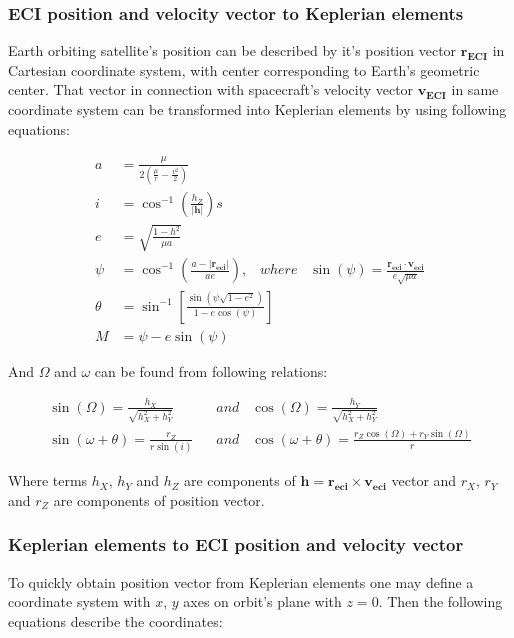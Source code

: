     \subsubsection{ECI position and velocity vector to Keplerian elements}
        Earth orbiting satellite's position can be described by it's position vector $\textbf{r}_{\textbf{ECI}}$ in Cartesian coordinate system, with center corresponding to Earth's geometric center. That vector in connection with spacecraft's velocity vector $\textbf{v}_{\textbf{ECI}}$ in same coordinate system can be transformed into Keplerian elements by using following equations:
        
        \begin{align}
            a &= \frac{\mu}{2\left(\frac{\mu}{r}-\frac{v^2}{2}\right)} \\
            i &= \cos^{-1}\left(\frac{h_Z}{|\textbf{h}|}\right)s \\
            e &= \sqrt{ \frac{1-h^2}{\mu a} } \\
            \psi &= \cos^{-1}\left(\frac{a-|\textbf{r}_{\textbf{eci}}|}{ae}\right), \;\;\; where \;\;\; \sin(\psi) = \frac{\textbf{r}_{\textbf{eci}}\cdot\textbf{v}_{\textbf{eci}}}{e\sqrt{\mu a}} \\
            \theta &= \sin^{-1}\left[\frac{\sin(\psi \sqrt{1-e^2})}{1-e\cos(\psi)}\right] \\
            M & = \psi - e\sin(\psi)
        \end{align}

        And $\Omega$ and $\omega$ can be found from following relations:

        \begin{align}
            \sin(\Omega) = \frac{h_X}{\sqrt{h^2_X+h^2_Y}}\;\;\; & and\;\;\; \cos(\Omega) = \frac{h_Y}{\sqrt{h^2_X+h^2_Y}} \\
            \sin(\omega+\theta) = \frac{r_Z}{r\sin(i)}\;\;\; & and\;\;\; \cos(\omega+\theta) = \frac{r_Z\cos(\Omega)+r_Y\sin(\Omega)}{r}
        \end{align}

        Where terms $h_X$, $h_Y$ and $h_Z$ are components of $\textbf{h}=\textbf{r}_{\textbf{eci}}\times \textbf{v}_{\textbf{eci}}$ vector and $r_X$, $r_Y$ and $r_Z$ are components of position vector.
    
    \subsubsection{Keplerian elements to ECI position and velocity vector}
        To quickly obtain position vector from Keplerian elements one may define a coordinate system with $x$, $y$ axes on orbit's plane with $z=0$. Then the following equations describe the coordinates:

